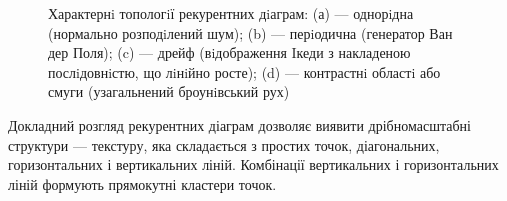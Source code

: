 \documentclass[
  letterpaper,
]{report}
\begin{document}
\begin{figure}
\begin{minipage}[t]{0.25\linewidth}
{{}

}

\end{minipage}%
%
\begin{minipage}[t]{0.25\linewidth}

{\centering 


}

\end{minipage}%

\caption{\label{fig-recurrence-diagrams}Характернi топологiї рекурентних
дiаграм: (а) --- однорiдна (нормально розподiлений шум); (b) ---
перiодична (генератор Ван дер Поля); (c) --- дрейф (вiдображення Iкеди з
накладеною послiдовнiстю, що лiнiйно росте); (d) --- контрастнi областi
або смуги (узагальнений броунiвський рух)}

\end{figure}

Докладний розгляд рекурентних діаграм дозволяє виявити дрібномасштабні
структури --- текстуру, яка складається з простих точок, діагональних,
горизонтальних і вертикальних ліній. Комбінації вертикальних і
горизонтальних ліній формують прямокутні кластери точок.
\end{document}
